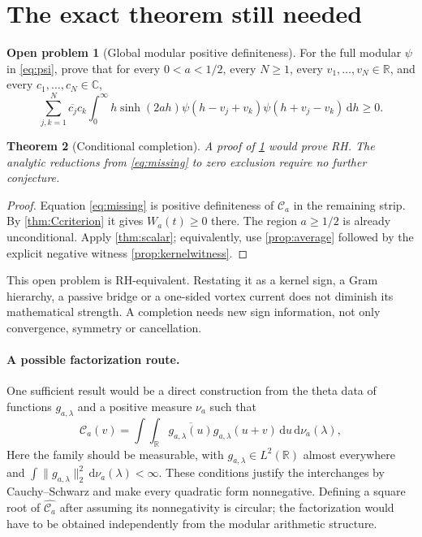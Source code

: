 \documentclass[11pt,letterpaper]{article}
\numberwithin{equation}{section}
\newtheorem{theorem}{Theorem}[section]
\theoremstyle{definition}
\newtheorem{problem}[theorem]{Open problem}
\theoremstyle{remark}
\newcommand{\R}{\mathbb R}
\newcommand{\C}{\mathbb C}
\newcommand{\dd}{\,\mathrm d}
\newcommand{\calC}{\mathcal C}
\begin{document}
\section{The exact theorem still needed}\label{sec:closure}
\begin{problem}[Global modular positive definiteness]\label{prob:global}
For the full modular $\psi$ in \eqref{eq:psi}, prove that for every $0<a<1/2$, every $N\ge1$, every $v_1,\ldots,v_N\in\R$, and every $c_1,\ldots,c_N\in\C$,
\begin{equation}\label{eq:missing}
\sum_{j,k=1}^N\overline{c_j}c_k
\int_0^\infty h\sinh(2ah)
\psi(h-v_j+v_k)\psi(h+v_j-v_k)\dd h\ge0.
\end{equation}
\end{problem}

\begin{theorem}[Conditional completion]\label{thm:completion}
A proof of \cref{prob:global} would prove RH. The analytic reductions from \eqref{eq:missing} to zero exclusion require no further conjecture.
\end{theorem}
\begin{proof}
Equation \eqref{eq:missing} is positive definiteness of $\calC_a$ in the remaining strip. By \cref{thm:Ccriterion} it gives $W_a(t)\ge0$ there. The region $a\ge1/2$ is already unconditional. Apply \cref{thm:scalar}; equivalently, use \cref{prop:average} followed by the explicit negative witness \cref{prop:kernelwitness}.
\end{proof}

This open problem is RH-equivalent. Restating it as a kernel sign, a Gram hierarchy, a passive bridge or a one-sided vortex current does not diminish its mathematical strength. A completion needs new sign information, not only convergence, symmetry or cancellation.

\paragraph{A possible factorization route.}
One sufficient result would be a direct construction from the theta data of functions $g_{a,\lambda}$ and a positive measure $\nu_a$ such that
\begin{equation}\label{eq:factorization}
\calC_a(v)=\int\!\int_\R
\overline{g_{a,\lambda}(u)}g_{a,\lambda}(u+v)\dd u\dd\nu_a(\lambda),
\end{equation}
Here the family should be measurable, with $g_{a,\lambda}\in L^2(\R)$ almost everywhere and $\int\|g_{a,\lambda}\|_2^2\dd\nu_a(\lambda)<\infty$. These conditions justify the interchanges by Cauchy--Schwarz and make every quadratic form nonnegative. Defining a square root of $\widehat{\calC_a}$ after assuming its nonnegativity is circular; the factorization would have to be obtained independently from the modular arithmetic structure.
\end{document}
